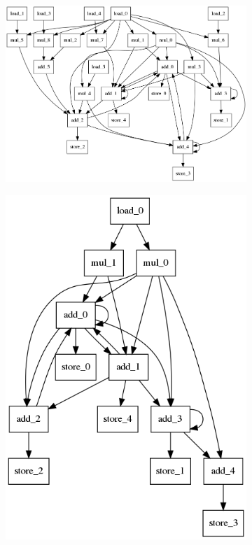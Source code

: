 \begin{figure}[ht]
\centering
\begin{subfigure}{.4\columnwidth}
  \centering
  \includegraphics[width=\textwidth]{images/Architecture_latency_146_schematic.png}
  \caption{}
  \label{fig:max_par_arch}
\end{subfigure}%
\begin{subfigure}{.3\columnwidth}
  \centering
  \includegraphics[width=\textwidth]{images/Architecture_latency_166_schematic.png}

\end{subfigure}
\end{figure}
